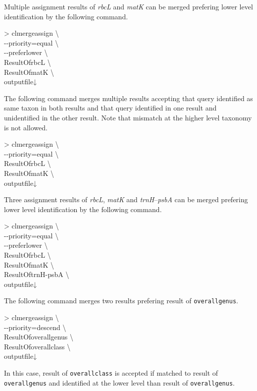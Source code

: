\documentclass[titlepage,10pt,a4paper,english]{jsbook}
\newenvironment{cmd}{\begin{oframed}\raggedright\ttfamily\footnotesize\setlength{\baselineskip}{1.4em}}{\end{oframed}\vspace{-1em}}
\begin{document}
Multiple assignment results of \textit{rbcL} and \textit{matK} can be merged prefering lower level identification by the following command.
\begin{cmd}
{\textgreater} clmergeassign {\textbackslash}\\
{-}{-}priority=equal {\textbackslash}\\
{-}{-}preferlower {\textbackslash}\\
ResultOfrbcL {\textbackslash}\\
ResultOfmatK {\textbackslash}\\
outputfile↓
\end{cmd}
The following command merges multiple results accepting that query identified as same taxon in both results and that query identified in one result and unidentified in the other result.
Note that mismatch at the higher level taxonomy is not allowed.
\begin{cmd}
{\textgreater} clmergeassign {\textbackslash}\\
{-}{-}priority=equal {\textbackslash}\\
ResultOfrbcL {\textbackslash}\\
ResultOfmatK {\textbackslash}\\
outputfile↓
\end{cmd}
Three assignment results of \textit{rbcL}, \textit{matK} and \textit{trnH}--\textit{psbA} can be merged prefering lower level identification by the following command.
\begin{cmd}
{\textgreater} clmergeassign {\textbackslash}\\
{-}{-}priority=equal {\textbackslash}\\
{-}{-}preferlower {\textbackslash}\\
ResultOfrbcL {\textbackslash}\\
ResultOfmatK {\textbackslash}\\
ResultOftrnH-psbA {\textbackslash}\\
outputfile↓
\end{cmd}
The following command merges two results prefering result of \texttt{overall{\textunderscore}genus}.
\begin{cmd}
{\textgreater} clmergeassign {\textbackslash}\\
{-}{-}priority=descend {\textbackslash}\\
ResultOfoverall{\textunderscore}genus {\textbackslash}\\
ResultOfoverall{\textunderscore}class {\textbackslash}\\
outputfile↓
\end{cmd}
In this case, result of \texttt{overall{\textunderscore}class} is accepted if matched to result of \texttt{overall{\textunderscore}genus} and identified at the lower level than result of \texttt{overall{\textunderscore}genus}.
\end{document}
